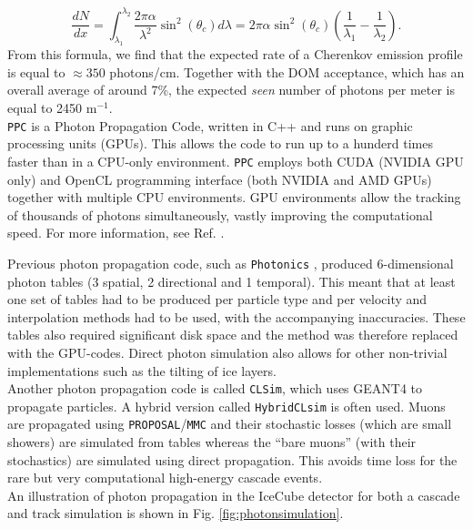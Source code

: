 \begin{equation}
\frac{dN}{dx} = \int_{\lambda_1}^{\lambda_2} \frac{2 \pi \alpha}{\lambda^2} \sin^2 \left(\theta_c\right) d\lambda = 2\pi \alpha \sin^2 \left(\theta_c\right) \left(\frac{1}{\lambda_1} -\frac{1}{\lambda_2}\right).
\end{equation}
From this formula, we find that the expected rate of a Cherenkov emission profile is equal to $\approx 350$ photons/cm. Together with the DOM acceptance, which has an overall average of around 7\%, the expected \textit{seen} number of photons per meter is equal to 2450 m$^{-1}$.\\

\noindent \texttt{PPC} is a Photon Propagation Code, written in C++ and runs on graphic processing units (GPUs). This allows the code to run up to a hunderd times faster than in a CPU-only environment. \texttt{PPC} employs both CUDA (NVIDIA GPU only) and OpenCL programming interface (both NVIDIA and AMD GPUs) together with multiple CPU environments.
GPU environments allow the tracking of thousands of photons simultaneously, vastly improving the computational speed. For more information, see Ref. \cite{dimaspice}.

Previous photon propagation code, such as \texttt{Photonics}  \cite{Lundberg:2007mf}, produced 6-dimensional photon tables (3 spatial, 2 directional and 1 temporal). This meant that at least one set of tables had to be produced per particle type and per velocity and interpolation methods had to be used, with the accompanying inaccuracies. These tables also required significant disk space and the method was therefore replaced with the GPU-codes. Direct photon simulation also allows for other non-trivial implementations such as the tilting of ice layers.\\

\noindent Another photon propagation code is called \texttt{CLSim}, which uses GEANT4 to propagate particles. A hybrid version called \texttt{HybridCLsim} is often used. Muons are propagated using \texttt{PROPOSAL}/\texttt{MMC}  and their stochastic losses (which are small showers) are simulated from tables whereas the ``bare muons'' (with their stochastics) are simulated using direct propagation. This avoids time loss for the rare but very computational high-energy cascade events.\\

\noindent An illustration of photon propagation in the IceCube detector for both a cascade and track simulation is shown in Fig. \ref{fig:photonsimulation}.

